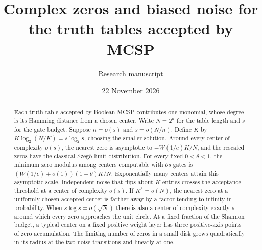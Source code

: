 \documentclass[11pt]{article}
\title{Complex zeros and biased noise for the truth tables accepted by MCSP}
\author{Research manuscript}
\date{22 November 2026}
\begin{document}
\maketitle
\begin{abstract}
Each truth table accepted by Boolean MCSP contributes one monomial, whose degree is its Hamming distance from a chosen center. Write $N=2^n$ for the table length and $s$ for the gate budget. Suppose $n=o(s)$ and $s=o(N/n)$. Define $K$ by $K\log_2(N/K)=s\log_2 s$, choosing the smaller solution. Around every center of complexity $o(s)$, the nearest zero is asymptotic to $-W(1/e)K/N$, and the rescaled zeros have the classical Szeg\H{o} limit distribution. For every fixed $0<\theta<1$, the minimum zero modulus among centers computable with $\theta s$ gates is $(W(1/e)+o(1))(1-\theta)K/N$. Exponentially many centers attain this asymptotic scale. Independent noise that flips about $K$ entries crosses the acceptance threshold at a center of complexity $o(s)$. If $K^3=o(N)$, the nearest zero at a uniformly chosen accepted center is farther away by a factor tending to infinity in probability. When $s\log s=o(\sqrt N)$ there is also a center of complexity exactly $s$ around which every zero approaches the unit circle. At a fixed fraction of the Shannon budget, a typical center on a fixed positive weight layer has three positive-axis points of zero accumulation. The limiting number of zeros in a small disk grows quadratically in its radius at the two noise transitions and linearly at one.
\end{abstract}
\end{document}
